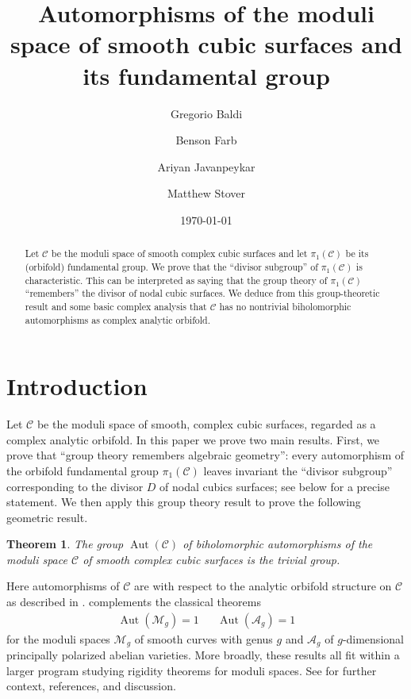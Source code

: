 \documentclass[11pt]{amsart}
\title[Automorphisms of the moduli of cubic surfaces]{Automorphisms of the 
moduli space of smooth cubic surfaces and its fundamental group}
\author[Baldi]{Gregorio Baldi}
\author[Farb]{Benson Farb}
\author[Javanpeykar]{Ariyan Javanpeykar}
\author[Stover]{Matthew Stover}
\date{\today}
\theoremstyle{plain}
\newtheorem{thm}{Theorem}[section]
\theoremstyle{definition}
\theoremstyle{remark}
\newcommand{\calA}{\mathcal{A}}
\newcommand{\calC}{\mathcal{C}}
\newcommand{\calM}{\mathcal{M}}
\DeclareMathOperator{\Aut}{Aut}
\begin{document}
\maketitle

\begin{abstract}
Let $\calC$ be the moduli space of smooth complex cubic surfaces and let $\pi_1(\calC)$ be its (orbifold) fundamental group. We prove that the ``divisor subgroup'' of $\pi_1(\calC)$ is characteristic. This can be interpreted as saying that the group theory of $\pi_1(\calC)$ ``remembers'' the divisor of nodal cubic surfaces. We deduce from this group-theoretic result and some basic complex analysis that $\calC$ has no nontrivial biholomorphic automorphisms as complex analytic orbifold.
\end{abstract}

\section{Introduction}\label{sec:Intro}

Let $\calC$ be the moduli space of smooth, complex cubic surfaces, regarded as a complex analytic orbifold. In this paper we prove two main results. First, we prove that ``group theory remembers algebraic geometry'': every automorphism of the orbifold fundamental group $\pi_1(\calC)$ leaves invariant the ``divisor subgroup'' corresponding to the divisor $D$ of nodal cubics surfaces; see below for a precise statement. We then apply this group theory result to prove the following geometric result.

\begin{thm}\label{theorem:main1}
The group $\Aut(\calC)$ of biholomorphic automorphisms of the moduli space $\calC$ of smooth complex cubic surfaces is the trivial group.
\end{thm}

Here automorphisms of $\calC$ are with respect to the analytic orbifold structure on $\calC$ as described in .  complements the classical theorems
	\begin{align*}%
	\Aut(\calM_g) = 1 && \Aut(\calA_g) = 1
	\end{align*}
for the moduli spaces $\calM_g$ of smooth curves with genus $g$ \cite{zbMATH03352015} and $\calA_g$ of $g$-dimensional principally polarized abelian varieties. More broadly, these results all fit within a larger program studying rigidity theorems for moduli spaces. See \cite{zbMATH07925348} for further context, references, and discussion.
\end{document}
